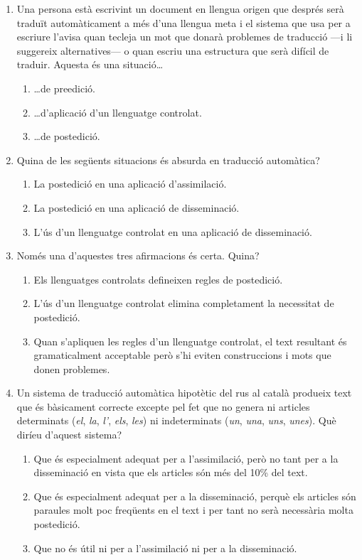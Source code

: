 \begin{enumerate}
\item Una persona està escrivint un document en llengua origen que
  després serà traduït automàticament a més d'una llengua meta i el
  sistema que usa per a escriure l'avisa quan tecleja un mot que
  donarà problemes de traducció ---i li suggereix alternatives--- o
  quan escriu una estructura que serà difícil de traduir. Aquesta és
  una situació\ldots
  \begin{enumerate}
  \item \ldots de preedició.
  \item \ldots d'aplicació d'un llenguatge controlat.
  \item \ldots de postedició.
  \end{enumerate}

\item Quina de les següents situacions és absurda en traducció
  automàtica?
  \begin{enumerate}
  \item La postedició en una aplicació d'assimilació.
  \item La postedició en una aplicació de disseminació.
  \item L'ús d'un llenguatge controlat en una aplicació de
    disseminació.
  \end{enumerate}

\item Només una d'aquestes tres afirmacions és certa. Quina?
  \begin{enumerate}
  \item Els llenguatges controlats defineixen regles de postedició.
  \item L'ús d'un llenguatge controlat elimina completament la
    necessitat de postedició.
  \item Quan s'apliquen les regles d'un llenguatge controlat, el text
    resultant és gramaticalment acceptable però s'hi eviten
    construccions i mots que donen problemes.
  \end{enumerate}

\item Un sistema de traducció automàtica hipotètic del rus al català
  produeix text que és bàsicament correcte excepte pel fet que no
  genera ni articles determinats (\emph{el}, \emph{la}, \emph{l'},
  \emph{els}, \emph{les}) ni indeterminats (\emph{un}, \emph{una},
  \emph{uns}, \emph{unes}). Què diríeu d'aquest sistema?
  \begin{enumerate}
  \item Que és especialment adequat per a l'assimilació, però no tant
    per a la disseminació en vista que els articles són més del 10\%
    del text.
  \item Que és especialment adequat per a la disseminació, perquè els
    articles són paraules molt poc freqüents en el text i per tant no
    serà necessària molta postedició.
  \item Que no és útil ni per a l'assimilació ni per a la
    disseminació.
  \end{enumerate}


\end{enumerate}
